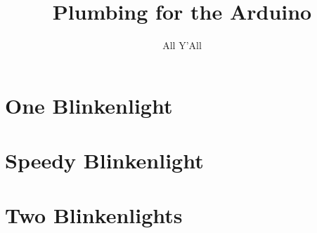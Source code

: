 \documentclass[a5paper]{scrbook}
\title{Plumbing for the Arduino}
\author{All Y'All}
\begin{document}
	
\maketitle
\tableofcontents

\chapter{One Blinkenlight}


\chapter{Speedy Blinkenlight}


\chapter{Two Blinkenlights}

\end{document}
